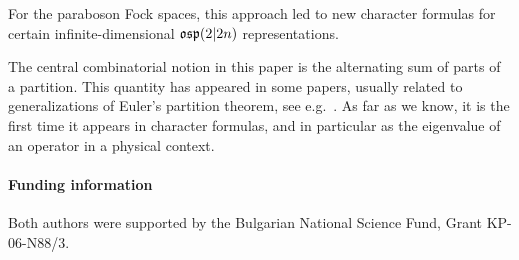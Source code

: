 \documentclass{SciPost}
\begin{document}
For the paraboson Fock spaces, this approach led to new character formulas for certain infinite-dimensional $\mathfrak{osp}(2|2n)$ representations.

The central combinatorial notion in this paper is the alternating sum of parts of a partition.
This quantity has appeared in some papers, usually related to generalizations of Euler's partition theorem, see e.g.~\cite{Chen}. 
As far as we know, it is the first time it appears in character formulas, and in particular as the eigenvalue of an operator in a physical context.





\paragraph{Funding information}
Both authors were supported by the Bulgarian National Science Fund, Grant KP-06-N88/3.

\



\end{document}
